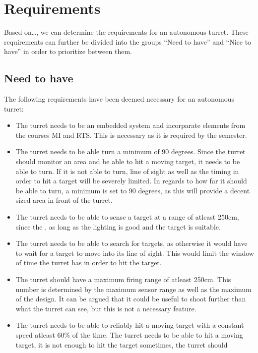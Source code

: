 \section{Requirements}

Based on\ldots, we can determine the requirements for an autonomous
turret.
These requirements can further be divided into the groups ``Need to have'' and
``Nice to have'' in order to prioritize between them.

\subsection{Need to have}
The following requirements have been deemed necessary for an autonomous turret:
\begin{itemize}
  \item The turret needs to be an embedded system and incorparate elements from
  the courses MI and RTS. This is necessary as it is required by the semester.
  \item The turret needs to be able turn a minimum of 90 degrees. Since the
  turret should monitor an area and be able to hit a moving target, it needs to
  be able to turn. If it is not able to turn, line of sight as well as the
  timing in order to hit a target will be severely limited. In regards to how
  far it should be able to turn, a minimum is set to 90 degrees, as this will
  provide a decent sized area in front of the turret.
  \item The turret needs to be able to sense a target at a range of atleast
  250cm, since the , as long as the
  lighting is good and the target is suitable.
  \item The turret needs to be able to search for targets, as otherwise it would
  have to wait for a target to move into its line of sight. This would limit
  the window of time the turret has in order to hit the target.
  \item The turret should have a maximum firing range of atleast 250cm. This
  number is determined by the maximum sensor range as well as the maximum of
  the design. It can be argued that it could be useful to shoot further than
  what the turret can see, but this is not a necessary feature.
  \item The turret needs to be able to reliably hit a moving target with a
  constant speed atleast 60\% of the time. The turret needs to be able to hit a
  moving target, it is not enough to hit the target sometimes, the turret should

\end{itemize}
